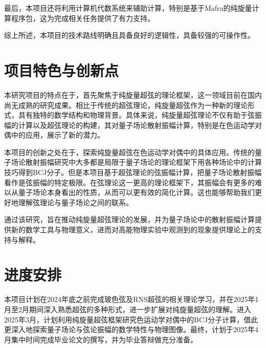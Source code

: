 \documentclass[type = bachelor]{whu-proposal}  %
\begin{document}
最后，本项目还将利用计算机代数系统来辅助计算，特别是基于Mafra的纯旋量计算程序包\cite{Mafra:2010pn}，这为完成相关任务提供了有力支持。

综上所述，本项目的技术路线明确且具备良好的逻辑性，具备较强的可操作性。

\section{项目特色与创新点}
本研究项目的特点在于，首先聚焦于纯旋量超弦的理论框架，这一领域目前在国内尚无成熟的研究成果。相比于传统的超弦理论，纯旋量超弦作为一种新的理论形式，具有独特的数学结构和物理背景。具体来说，纯旋量超弦理论不仅有助于弦振幅的计算以及超弦理论的构建，其对量子场论散射振幅计算，特别是在色运动学对偶中的应用，展示了新的潜力。

本项目的创新之处在于，探索纯旋量超弦在色运动学对偶中的具体应用。传统的量子场论散射振幅研究中大多都是局限于量子场论的理论框架下用各种场论中的计算技巧得到BCJ分子。但是本项目基于超弦理论的弦振幅计算，把量子场论散射振幅看作是弦振幅的特定极限。在弦理论这一更高的理论框架下，其振幅会有更多的难以从量子场论本身看出的性质，从而可以更有效的简化计算。这也能够帮助我们更好地理解弦理论与量子场论之间的联系。

通过该研究，旨在推动纯旋量超弦理论的发展，并为量子场论中的散射振幅计算提供新的数学工具与物理意义，进而对高能物理实验中观测到的现象提供理论上的支持与解释。

\section{进度安排}
本项目计划在2024年底之前完成玻色弦及RNS超弦的相关理论学习，并在2025年1月至2月期间深入熟悉超弦的多种形式，进一步扩展对纯旋量超弦的理解。进入2025年3月，计划利用纯旋量超弦框架研究色运动学对偶中的BCJ分子计算，借此更深入地探索量子场论与弦论振幅的数学特性与物理图像。最终，计划于2025年4月集中时间完成毕业论文的撰写，并为毕业答辩做充分准备。

\nocite{*}
\printbibliography[heading=bibintoc,title={六、主要参考文献}]
\end{document}
